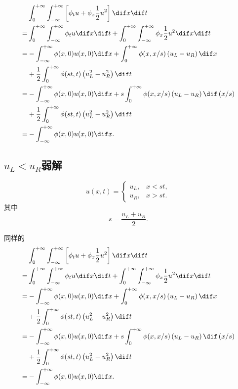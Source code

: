 \documentclass[12pt]{article}
\begin{document}
\begin{align}
	& \int_{0}^{+\infty} \int_{-\infty}^{+\infty}\left[\phi_{t} {u}+\phi_{x} \frac{1}{2}u^2\right] \dif x \dif t \\
	= & \int_{0}^{+\infty} \int_{-\infty}^{+\infty}\phi_{t} {u} \dif x \dif t + \int_{0}^{+\infty} \int_{-\infty}^{+\infty}\phi_{x} \frac{1}{2}u^2 \dif x \dif t \\
	= & -\int_{-\infty}^{+\infty} \phi(x, 0) {u}(x, 0) \dif x +  \int_{0}^{+\infty} \phi(x, x/s) \left(u_L-u_R\right) \dif x\\
	& + \frac{1}{2} \int_{0}^{+\infty} \phi(st, t) \left(u_L^2-u_R^2\right) \dif t\\
	= & -\int_{-\infty}^{+\infty} \phi(x, 0) {u}(x, 0) \dif x +  s \int_{0}^{+\infty} \phi(x, x/s) \left(u_L-u_R\right) \dif\, (x/s)\\
	& + \frac{1}{2} \int_{0}^{+\infty} \phi(st, t) \left(u_L^2-u_R^2\right) \dif t\\
	= & -\int_{-\infty}^{+\infty} \phi(x, 0) {u}(x, 0) \dif x.
\end{align}

\subsection{$u_L<u_R$弱解}


\begin{equation}
	u(x, t)=
	\begin{cases}
		u_{L}, & x<s t, \\
		u_{R}, & x>s t	.
	\end{cases}
\end{equation}
其中
\begin{equation}
	s=\frac{u_L+u_R}{2}.
\end{equation}

同样的
\begin{align}
	& \int_{0}^{+\infty} \int_{-\infty}^{+\infty}\left[\phi_{t} {u}+\phi_{x} \frac{1}{2}u^2\right] \dif x \dif t \\
	= & \int_{0}^{+\infty} \int_{-\infty}^{+\infty}\phi_{t} {u} \dif x \dif t + \int_{0}^{+\infty} \int_{-\infty}^{+\infty}\phi_{x} \frac{1}{2}u^2 \dif x \dif t \\
	= & -\int_{-\infty}^{+\infty} \phi(x, 0) {u}(x, 0) \dif x +  \int_{0}^{+\infty} \phi(x, x/s) \left(u_L-u_R\right) \dif x\\
	& + \frac{1}{2} \int_{0}^{+\infty} \phi(st, t) \left(u_L^2-u_R^2\right) \dif t\\
	= & -\int_{-\infty}^{+\infty} \phi(x, 0) {u}(x, 0) \dif x +  s \int_{0}^{+\infty} \phi(x, x/s) \left(u_L-u_R\right) \dif\, (x/s)\\
	& + \frac{1}{2} \int_{0}^{+\infty} \phi(st, t) \left(u_L^2-u_R^2\right) \dif t\\
	= & -\int_{-\infty}^{+\infty} \phi(x, 0) {u}(x, 0) \dif x.
\end{align}
\end{document}
